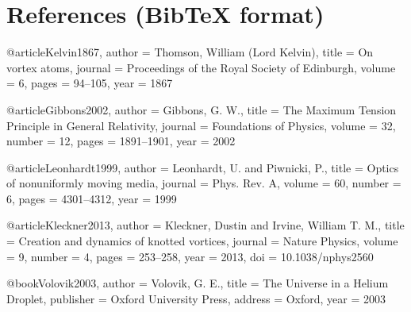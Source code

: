 \section*{References (BibTeX format)}

@article{Kelvin1867,
  author    = {Thomson, William (Lord Kelvin)},
  title     = {On vortex atoms},
  journal   = {Proceedings of the Royal Society of Edinburgh},
  volume    = {6},
  pages     = {94--105},
  year      = {1867}
}

@article{Gibbons2002,
  author    = {Gibbons, G. W.},
  title     = {The Maximum Tension Principle in General Relativity},
  journal   = {Foundations of Physics},
  volume    = {32},
  number    = {12},
  pages     = {1891--1901},
  year      = {2002}
}

@article{Leonhardt1999,
  author    = {Leonhardt, U. and Piwnicki, P.},
  title     = {Optics of nonuniformly moving media},
  journal   = {Phys. Rev. A},
  volume    = {60},
  number    = {6},
  pages     = {4301--4312},
  year      = {1999}
}

@article{Kleckner2013,
  author    = {Kleckner, Dustin and Irvine, William T. M.},
  title     = {Creation and dynamics of knotted vortices},
  journal   = {Nature Physics},
  volume    = {9},
  number    = {4},
  pages     = {253--258},
  year      = {2013},
  doi       = {10.1038/nphys2560}
}

@book{Volovik2003,
  author    = {Volovik, G. E.},
  title     = {The Universe in a Helium Droplet},
  publisher = {Oxford University Press},
  address   = {Oxford},
  year      = {2003}
}
